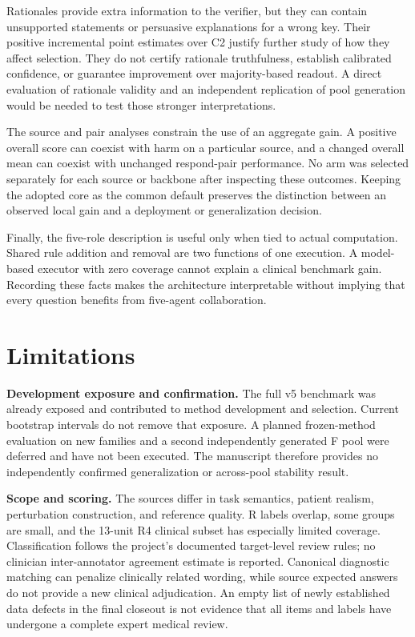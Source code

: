 \documentclass[
  english,
  11pt,
]{article}
\begin{document}
Rationales provide extra information to the verifier, but they can
contain unsupported statements or persuasive explanations for a wrong
key. Their positive incremental point estimates over C2 justify further
study of how they affect selection. They do not certify rationale
truthfulness, establish calibrated confidence, or guarantee improvement
over majority-based readout. A direct evaluation of rationale validity
and an independent replication of pool generation would be needed to
test those stronger interpretations.

The source and pair analyses constrain the use of an aggregate gain. A
positive overall score can coexist with harm on a particular source, and
a changed overall mean can coexist with unchanged respond-pair
performance. No arm was selected separately for each source or backbone
after inspecting these outcomes. Keeping the adopted core as the common
default preserves the distinction between an observed local gain and a
deployment or generalization decision.

Finally, the five-role description is useful only when tied to actual
computation. Shared rule addition and removal are two functions of one
execution. A model-based executor with zero coverage cannot explain a
clinical benchmark gain. Recording these facts makes the architecture
interpretable without implying that every question benefits from
five-agent collaboration.

\section{Limitations}\label{limitations}

\textbf{Development exposure and confirmation.} The full v5 benchmark
was already exposed and contributed to method development and selection.
Current bootstrap intervals do not remove that exposure. A planned
frozen-method evaluation on new families and a second independently
generated F pool were deferred and have not been executed. The
manuscript therefore provides no independently confirmed generalization
or across-pool stability result.

\textbf{Scope and scoring.} The sources differ in task semantics,
patient realism, perturbation construction, and reference quality. R
labels overlap, some groups are small, and the 13-unit R4 clinical
subset has especially limited coverage. Classification follows the
project's documented target-level review rules; no clinician
inter-annotator agreement estimate is reported. Canonical diagnostic
matching can penalize clinically related wording, while source expected
answers do not provide a new clinical adjudication. An empty list of
newly established data defects in the final closeout is not evidence
that all items and labels have undergone a complete expert medical
review.
\end{document}
